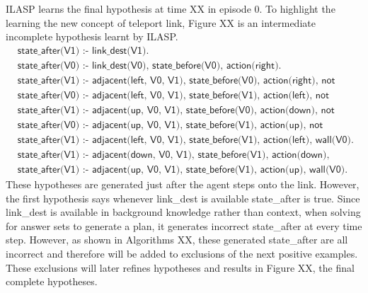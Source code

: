 ILASP learns the final hypothesis at time XX in episode 0.
To highlight the learning the new concept of teleport link, Figure XX is an intermediate incomplete hypothesis learnt by ILASP.
\begin{equation*}
\begin{split}
&\textsf{state\_after(V1) :- link\_dest(V1).}\\
&\textsf{state\_after(V0) :- link\_dest(V0), state\_before(V0), action(right).}\\
&\textsf{state\_after(V1) :- adjacent(left, V0, V1), state\_before(V0), action(right), not wall(V1).}\\
&\textsf{state\_after(V0) :- adjacent(left, V0, V1), state\_before(V1), action(left), not wall(V0).}\\
&\textsf{state\_after(V1) :- adjacent(up, V0, V1), state\_before(V0), action(down), not wall(V1).}\\
&\textsf{state\_after(V0) :- adjacent(up, V0, V1), state\_before(V1), action(up), not wall(V0).}\\
&\textsf{state\_after(V1) :- adjacent(left, V0, V1), state\_before(V1), action(left), wall(V0).}\\
&\textsf{state\_after(V1) :- adjacent(down, V0, V1), state\_before(V1), action(down), wall(V0).}\\
&\textsf{state\_after(V1) :- adjacent(up, V0, V1), state\_before(V1), action(up), wall(V0).}
\end{split}
\end{equation*}
These hypotheses are generated just after the agent steps onto the link. However, the first hypothesis says
whenever link\_dest is available state\_after is true. Since link\_dest is available in background knowledge rather than context, 
when solving for answer sets to generate a plan, it generates incorrect state\_after at every time step. 
However, as shown in Algorithms XX, these generated state\_after are all incorrect and therefore will be added to exclusions of the next positive examples. 
These exclusions will later refines hypotheses and results in Figure XX, the final complete hypotheses.

